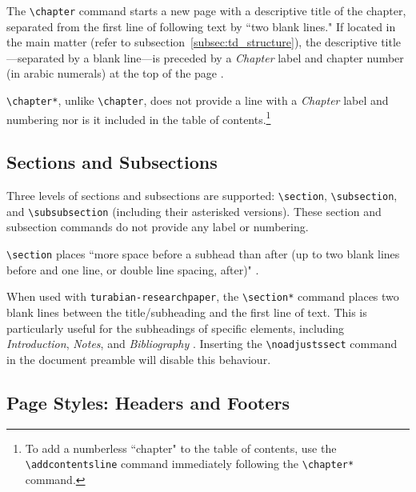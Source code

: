 \documentclass{article}
\newcommand{\textcmd}[1]{\texttt{\textbackslash #1}}
\begin{document}
The \textcmd{chapter} command starts a new page with a descriptive title of the chapter, separated from the first line of following text by ``two blank lines." If located in the main matter (refer to subsection~\ref{subsec:td_structure}), the descriptive title---separated by a blank line---is preceded by a \emph{Chapter} label and chapter number (in arabic numerals) at the top of the page \autocite[391]{turabian_manual_2013}.

\textcmd{chapter*}, unlike \textcmd{chapter}, does not provide a line with a \emph{Chapter} label and numbering nor is it included in the table of contents.\footnote{%
	To add a numberless ``chapter" to the table of contents, use the \textcmd{addcontentsline} command immediately following the \textcmd{chapter*} command.}


\clearpage
\subsection{Sections and Subsections}

Three levels of sections and subsections are supported: \textcmd{section}, \textcmd{subsection}, and \textcmd{subsubsection} (including their asterisked versions). These section and subsection commands do not provide any label or numbering.

\textcmd{section} places ``more space before a subhead than after (up to two blank lines before and one line, or double line spacing, after)" \autocite[393]{turabian_manual_2013}.

When used with \texttt{turabian-researchpaper}, the \textcmd{section*} command places two blank lines between the title/subheading and the first line of text. This is particularly useful for the subheadings of specific elements, including \emph{Introduction}, \emph{Notes}, and \emph{Bibliography} \autocite[390--401]{turabian_manual_2013}. Inserting the \textcmd{noadjustssect} command in the document preamble will disable this behaviour.


\subsection{Page Styles: Headers and Footers}
\label{subsec:page_styles}
\end{document}
